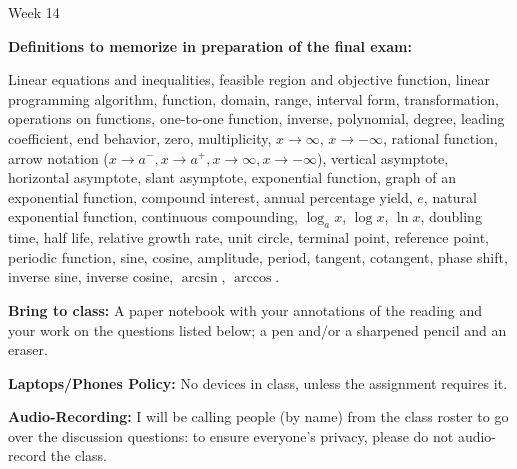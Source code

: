\documentclass[12pt,dvipsnames]{article}
\begin{document}
\thispagestyle{empty}

	\begin{center}
		{\large{Week 14}}
	\end{center}



	{\bfseries{Definitions to memorize in preparation of the final exam:}} 

\begin{description}[topsep=0pt,itemsep=-2ex,partopsep=0ex,parsep=1ex]
\item[From Weeks 1-14] Linear equations and inequalities, feasible region and objective function, linear programming algorithm,  function, domain, range, interval form, transformation, operations on functions, one-to-one function, inverse, polynomial, degree, leading coefficient, end behavior, zero, multiplicity, $x\to \infty$, $x\to -\infty$, rational function, arrow notation ($x\to a^{-}, x\to a^{+}, x\to \infty, x\to -\infty$), vertical asymptote, horizontal asymptote, slant asymptote, exponential function, graph of an exponential function, compound interest, annual percentage yield, $e$, natural exponential function, continuous compounding, $\log_a x$, $\log x$, $\ln x$, doubling time, half life, relative growth rate, unit circle, terminal point, reference point, periodic function, sine, cosine, amplitude, period, tangent, cotangent, phase shift, inverse sine, inverse cosine, $\arcsin$, $\arccos$.
\end{description}
\smallskip	


		
{\bfseries{Bring to class:} } A paper notebook with your annotations of the reading and your work on the questions listed below; a pen and/or a sharpened pencil and an eraser.

{\bfseries{Laptops/Phones Policy:}}  No devices in class, unless the assignment requires it.

{\bfseries{Audio-Recording:}} I will be calling people (by name) from the class roster to go over the discussion questions: to ensure everyone's privacy, please do not audio-record the class.




\end{document}
